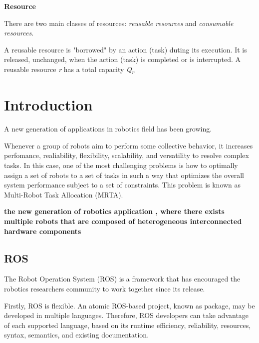\textbf{Resource}

There are two main classes of resources: \textit{reusable resources} and \textit{consumable resources}.

A reusable resource is "borrowed" by an action (task) duting its execution. It is released, unchanged, when the action (task) is completed or is interrupted. A reusable resource \textit{r} has a total capacity \textit{Q\textsubscript{r}}




\section{Introduction}

A new generation of applications in robotics field has been growing. 

Whenever a group of robots aim to perform some collective behavior, it increases perfomance, realiability, flexibility, scalability, and versatility to resolve complex tasks. In this case, one of the most challenging problems is how to optimally assign a set of robots to a set of tasks in such a way that optimizes the overall system performance subject to a set of constraints. This problem is known as Multi-Robot Task Allocation (MRTA).

\textbf{the new generation of robotics application \cite{ref:mohamed2008middleware}, where there exists multiple robots that are composed of heterogeneous interconnected hardware components} 

\subsection{ROS}

The Robot Operation System (ROS) \cite{ref:quigley2009ros} is a framework that has encouraged the robotics researchers community to work together since its release. 

Firstly, ROS is flexible. An atomic ROS-based project, known as package, may be developed in multiple languages. Therefore, ROS developers can take advantage of each supported language, based on its runtime efficiency, reliability, resources, syntax, semantics, and existing documentation. 


